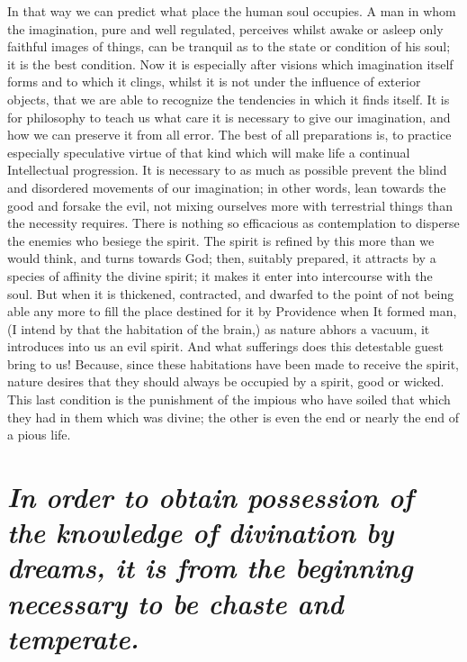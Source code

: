 \documentclass[12pt]{article}
\begin{document}
In that way we can predict what place the human soul occupies. A man in whom
the imagination, pure and well regulated, perceives whilst awake or asleep only
faithful images of things, can be tranquil as to the state or condition of his
soul; it is the best condition. Now it is especially after visions which
imagination itself forms and to which it clings, whilst it is not under the
influence of exterior objects, that we are able to recognize the tendencies in
which it finds itself. It is for philosophy to teach us what care it is
necessary to give our imagination, and how we can preserve it from all error.
The best of all preparations is, to practice especially speculative virtue of
that kind which will make life a continual Intellectual progression. It is
necessary to as much as possible prevent the blind and disordered movements of
our imagination; in other words, lean towards the good and forsake the evil,
not mixing ourselves more with terrestrial things than the necessity requires.
There is nothing so efficacious as contemplation to disperse the enemies who
besiege the spirit. The spirit is refined by this more than we would think, and
turns towards God; then, suitably prepared, it attracts by a species of
affinity the divine spirit; it makes it enter into intercourse with the soul.
But when it is thickened, contracted, and dwarfed to the point of not being
able any more to fill the place destined for it by Providence when It formed
man, (I intend by that the habitation of the brain,) as nature abhors a vacuum,
it introduces into us an evil spirit. And what sufferings does this detestable
guest bring to us! Because, since these habitations have been made to receive
the spirit, nature desires that they should always be occupied by a spirit,
good or wicked. This last condition is the punishment of the impious who have
soiled that which they had in them which was divine; the other is even the end
or nearly the end of a pious life.


\section{\mdseries\itshape In order to obtain possession of the knowledge of
divination by dreams, it is from the beginning necessary to be chaste and
temperate.}
\end{document}
